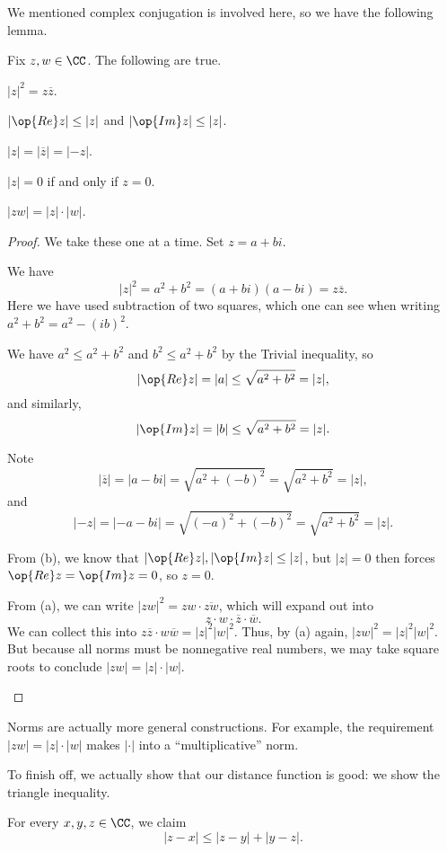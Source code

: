 \documentclass[../notes.tex]{subfiles}
\begin{document}
We mentioned complex conjugation is involved here, so we have the following lemma.
\begin{lemma}
	Fix $z,w\in\CC$. The following are true.
	\begin{listalph}
		\item $|z|^2=z\overline z$.
		\item $|\op{Re}z|\le|z|$ and $|\op{Im}z|\le|z|$.
		\item $|z|=|\overline z|=|-z|$.
		\item $|z|=0$ if and only if $z=0$.
		\item $|zw|=|z|\cdot|w|$.
	\end{listalph}
\end{lemma}
\begin{proof}
	We take these one at a time. Set $z=a+bi$.
	\begin{listalph}
		\item We have
		\[|z|^2=a^2+b^2=(a+bi)(a-bi)=z\overline z.\]
		Here we have used subtraction of two squares, which one can see when writing $a^2+b^2=a^2-(ib)^2$.
		\item We have $a^2\le a^2+b^2$ and $b^2\le a^2+b^2$ by the Trivial inequality, so
		\[|\op{Re}z|=|a|\le\sqrt{a^2+b^2}=|z|,\]
		and similarly,
		\[|\op{Im}z|=|b|\le\sqrt{a^2+b^2}=|z|.\]
		\item Note
		\[|\overline z|=|a-bi|=\sqrt{a^2+(-b)^2}=\sqrt{a^2+b^2}=|z|,\]
		and
		\[|-z|=|-a-bi|=\sqrt{(-a)^2+(-b)^2}=\sqrt{a^2+b^2}=|z|.\]
		\item From (b), we know that $|\op{Re}z|,|\op{Im}z|\le|z|$, but $|z|=0$ then forces $\op{Re}z=\op{Im}z=0$, so $z=0$.
		\item From (a), we can write $|zw|^2=zw\cdot\overline{zw}$, which will expand out into
		\[z\cdot w\cdot\overline z\cdot\overline w.\]
		We can collect this into $z\overline z\cdot w\overline w=|z|^2|w|^2$. Thus, by (a) again, $|zw|^2=|z|^2|w|^2$. But because all norms must be nonnegative real numbers, we may take square roots to conclude $|zw|=|z|\cdot|w|$.
		\qedhere
	\end{listalph}
\end{proof}
\begin{remark}
	Norms are actually more general constructions. For example, the requirement $|zw|=|z|\cdot|w|$ makes $|\cdot|$ into a ``multiplicative'' norm.
\end{remark}
To finish off, we actually show that our distance function is good: we show the triangle inequality.
\begin{lemma}
	For every $x,y,z\in\CC$, we claim
	\[|z-x|\le|z-y|+|y-z|.\]
\end{lemma}
\end{document}
